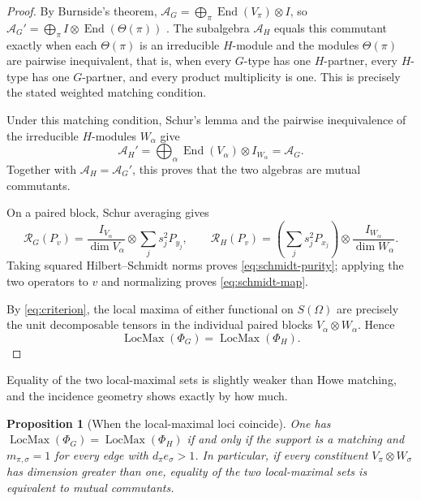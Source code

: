 \documentclass[10pt]{amsart}
\newtheorem{proposition}[theorem]{Proposition}
\theoremstyle{remark}
\DeclareMathOperator{\End}{End}
\DeclareMathOperator{\LocMax}{LocMax}
\begin{document}
\begin{proof}
By Burnside's theorem,
$\mathcal A_G=\bigoplus_\pi\End(V_\pi)\otimes I$, so
$\mathcal A_G'=\bigoplus_\pi I\otimes\End(\Theta(\pi))$ \cite{GoodmanWallach}. The subalgebra
$\mathcal A_H$ equals this commutant exactly when each $\Theta(\pi)$ is an irreducible $H$-module and the
modules $\Theta(\pi)$ are pairwise inequivalent, that is, when every $G$-type has one $H$-partner, every
$H$-type has one $G$-partner, and every product multiplicity is one. This is precisely the stated weighted
matching condition.

Under this matching condition, Schur's lemma and the
pairwise inequivalence of the irreducible $H$-modules
$W_\alpha$ give
\[
 \mathcal{A}_H'
 =
 \bigoplus_\alpha
 \operatorname{End}(V_\alpha)\otimes I_{W_\alpha}
 =
 \mathcal{A}_G.
\]
Together with $\mathcal{A}_H=\mathcal{A}_G'$,
this proves that the two algebras are mutual commutants.

On a paired block, Schur averaging gives
\[
 \mathcal R_G(P_v)
 =\frac{I_{V_\alpha}}{\dim V_\alpha}\otimes\sum_j s_j^2P_{y_j},
 \qquad
 \mathcal R_H(P_v)
 =\left(\sum_j s_j^2P_{x_j}\right)\otimes\frac{I_{W_\alpha}}{\dim W_\alpha}.
\]
Taking squared Hilbert--Schmidt norms proves \eqref{eq:schmidt-purity}; applying the two operators to $v$ and
normalizing proves \eqref{eq:schmidt-map}.

By \eqref{eq:criterion}, the local maxima of either
functional on $S(\Omega)$ are precisely the unit
decomposable tensors in the individual paired blocks
$V_\alpha\otimes W_\alpha$.
Hence
\[
 \operatorname{LocMax}(\Phi_G)
 =
 \operatorname{LocMax}(\Phi_H).
\]
\end{proof}

Equality of the two local-maximal sets is slightly weaker than Howe matching, and the incidence
geometry shows exactly by how much.

\begin{proposition}[When the local-maximal loci coincide]\label{prop:equal-locmax}
One has $\LocMax(\Phi_G)=\LocMax(\Phi_H)$ if and only if the support is a matching and
$m_{\pi,\sigma}=1$ for every edge with $d_\pi e_\sigma>1$. In particular, if every constituent
$V_\pi\otimes W_\sigma$ has dimension greater than one, equality of the two local-maximal sets is
equivalent to mutual commutants.
\end{proposition}
\end{document}
